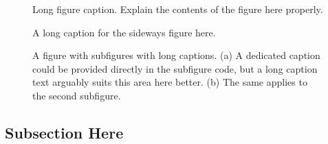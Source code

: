 \begin{figure}[t!]
\centering
    \figbox{\rule{.1pt}{2cm} \rule[1cm]{2cm}{.1pt} \rule{.1pt}{2cm}}
	\caption[Short caption for example figure]{Long figure caption.
	Explain the contents of the figure here properly.}%
	\label{fig:introduction-example}%
\end{figure} 

\kant[9-15]


\begin{sidewaysfigure}
\centering
    \figbox{\rule{.1pt}{5cm} \rule[2.5cm]{13cm}{.1pt} \rule{.1pt}{5cm}}
	\caption[Sideways figure example]{A long caption for the sideways figure here.}%
	\label{fig:introduction-example-sideways}%
\end{sidewaysfigure}

\begin{figure}[t!]
	\begin{subfigure}[t]{0.477\linewidth}
			\centering
			\figbox{\rule{.1pt}{2cm} \rule[1cm]{2cm}{.1pt} \rule{.1pt}{2cm}}
			\caption{}%
	\end{subfigure}%
	\hspace{3pt}
	\begin{subfigure}[t]{0.4754\linewidth}
			\centering
			\figbox{\rule{.1pt}{2cm} \rule[1cm]{2cm}{.1pt} \rule{.1pt}{2cm}}
			\caption{}%
	\end{subfigure}%
	\caption[Short caption for a figure with subfigures]{A figure with subfigures with long captions. 
	(a) A dedicated caption could be provided directly in the subfigure code, but a long caption text arguably suits this area here better. 
    (b) The same applies to the second subfigure.
	}%
	\label{fig:intro-subfigures}%
\end{figure} 


\subsection{Subsection Here}\label{subsec:intro-subsection}

